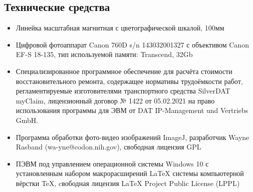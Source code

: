 \subsection{Технические средства}  %
\begin{itemize}
%
%
\item   Линейка масштабная магнитная с цветографической шкалой, 100мм
%
\item 	Цифровой фотоаппарат Canon 760D s/n 143032001327 с объективом Canon EF-S 18-135, тип используемой памяти: Transcend,  32Gb
%
\item  Специализированное программное обеспечение для расчёта стоимости  восстановительного ремонта, содержащее нормативы трудоёмкости работ, регламентируемые изготовителями транспортного средства  SilverDAT myClaim,
лицензионный договор № 1422 от 05.02.2021 на право использования программы для ЭВМ от  DAT IP-Management und Vertriebs GmbH.

%
\item  Программа обработки фото-видео изображений ImageJ, разработчик  Wayne Rasband (wa-yne@codon.nih.gov),
свободная лицензия GPL
%
\item  ПЭВМ под управлением операционной системы Windows 10 с установленным набором макрорасширений LaTeX системы компьютерной вёрстки TeX, cвободная лицензия LaTeX Project Public License (LPPL)
%	
\end{itemize}
